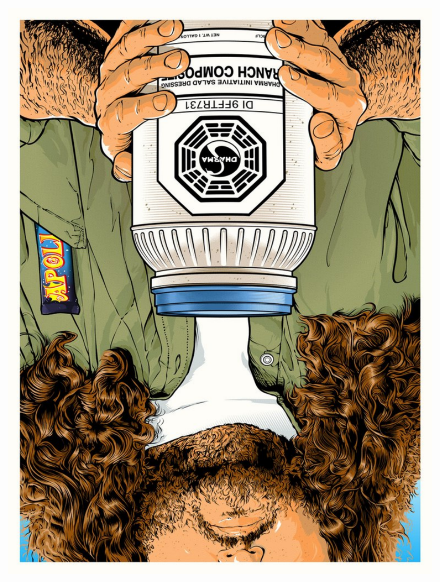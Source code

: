 \documentclass[12pt, a4paper]{article}
\begin{document}
\begin{figure}
\begin{minipage}[h!]{0.3\textwidth}
\includegraphics[width=\textwidth, angle=180]{pop10.pdf}
\end{minipage}
\vfill


\end{figure}
\end{document}
